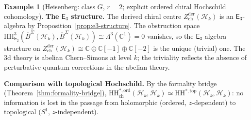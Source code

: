 \documentclass[11pt,reqno]{amsart}
\theoremstyle{definition}
\newtheorem{example}[theorem]{Example}
\theoremstyle{remark}
\newcommand{\cH}{\mathcal{H}}
\newcommand{\HH}{\mathrm{HH}}
\newcommand{\Etwo}{\mathsf{E}_{2}}
\newcommand{\Ethree}{\mathsf{E}_{3}}
\newcommand{\BarSig}{\overline{B}^{\Sigma}}
\newcommand{\CC}{\mathbb{C}}
\numberwithin{equation}{section}
\begin{document}
\begin{example}[Heisenberg: class $G$, $r = 2$;
explicit ordered chiral Hochschild cohomology]
\medskip
\noindent
\textbf{The $\Ethree$ structure.}
The derived chiral centre
$Z^{\mathrm{der}}_{\mathrm{ch}}(\cH_k)$ is an
$\Ethree$-algebra by Proposition~\ref{prop:e3-structure}.
The obstruction space
$\HH^3_{\Etwo}(\BarSig(\cH_k), \BarSig(\cH_k))
\cong \Lambda^3(\CC^1) = 0$
vanishes, so the $\Ethree$-algebra structure on
$Z^{\mathrm{der}}_{\mathrm{ch}}(\cH_k)
\cong \CC \oplus \CC[-1] \oplus \CC[-2]$
is the unique (trivial) one.
The $3$d theory is abelian Chern--Simons at level $k$;
the triviality reflects the absence of perturbative quantum
corrections in the abelian theory.

\medskip
\noindent
\textbf{Comparison with topological Hochschild.}
By the formality bridge (Theorem~\ref{thm:formality-bridge}),
$\HH^{*,\mathrm{ord}}_{\mathrm{ch}}(\cH_k, \cH_k)
\simeq \HH^{*,\mathrm{top}}(\cH_k, \cH_k)$:
no information is lost in the passage from holomorphic
(ordered, $z$-dependent) to topological
($S^1$, $z$-independent).
\end{example}
\end{document}
